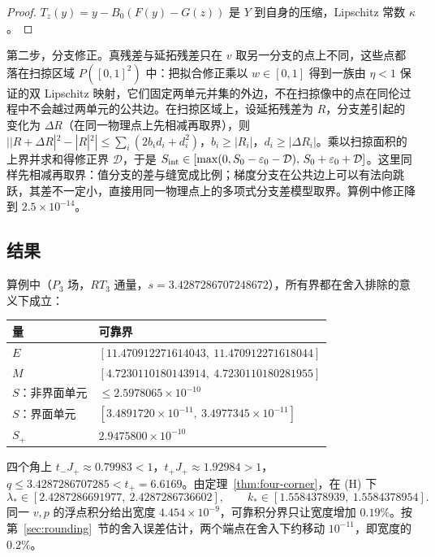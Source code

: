 \documentclass[11pt,a4paper,fontset=fandol]{ctexart}
\theoremstyle{plain}
\theoremstyle{definition}
\theoremstyle{remark}
\begin{document}
\begin{proof}
$T_z(y)=y-B_0(F(y)-G(z))$ 是 $Y$ 到自身的压缩，Lipschitz 常数 $\kappa$。
\end{proof}

第二步，分支修正。真残差与延拓残差只在 $v$ 取另一分支的点上不同，这些点都落在扫掠区域 $P([0,1]^2)$ 中：把拟合修正乘以 $w\in[0,1]$ 得到一族由 $\eta<1$ 保证的双 Lipschitz 映射，它们固定两单元并集的外边，不在扫掠像中的点在同伦过程中不会越过两单元的公共边。在扫掠区域上，设延拓残差为 $R$，分支差引起的变化为 $\Delta R$（在同一物理点上先相减再取界），则 $||R+\Delta R|^2-|R|^2|\le\sum_i(2b_id_i+d_i^2)$，$b_i\ge|R_i|$，$d_i\ge|\Delta R_i|$。乘以扫掠面积的上界并求和得修正界 $\mathcal D$，于是 $S_{\rm int}\in[\max(0,S_0-\varepsilon_0-\mathcal D),\,S_0+\varepsilon_0+\mathcal D]$。这里同样先相减再取界：值分支的差与缝宽成比例；梯度分支在公共边上可以有法向跳跃，其差不一定小，直接用同一物理点上的多项式分支差模型取界。算例中修正降到 $2.5\times10^{-14}$。

\subsection{结果}

算例中（$P_3$ 场，$RT_3$ 通量，$s=3.4287286707248672$），所有界都在舍入排除的意义下成立：
\begin{center}
\small
\begin{tabular}{ll}
\toprule
量 & 可靠界 \\
\midrule
$E$ & $[11.470912271614043,\ 11.470912271618044]$ \\
$M$ & $[4.7230110180143914,\ 4.7230110180281955]$ \\
$S$：非界面单元 & $\le2.5978065\times10^{-10}$ \\
$S$：界面单元 & $[3.4891720\times10^{-11},\ 3.4977345\times10^{-11}]$ \\
$S_+$ & $2.9475800\times10^{-10}$ \\
\bottomrule
\end{tabular}
\end{center}
四个角上 $t_-J_+\approx0.79983<1$，$t_+J_+\approx1.92984>1$，$q\le3.4287286707285<t_+=6.6169$。由定理~\ref{thm:four-corner}，在 (H) 下
\begin{equation}
\label{eq:main-interval}
\lambda_*\in[2.4287286691977,\ 2.4287286736602],\qquad k_*\in[1.5584378939,\ 1.5584378954].
\end{equation}
同一 $v,p$ 的浮点积分给出宽度 $4.454\times10^{-9}$，可靠积分界只让宽度增加 $0.19\%$。按第~\ref{sec:rounding}~节的舍入误差估计，两个端点在舍入下约移动 $10^{-11}$，即宽度的 $0.2\%$。
\end{document}
